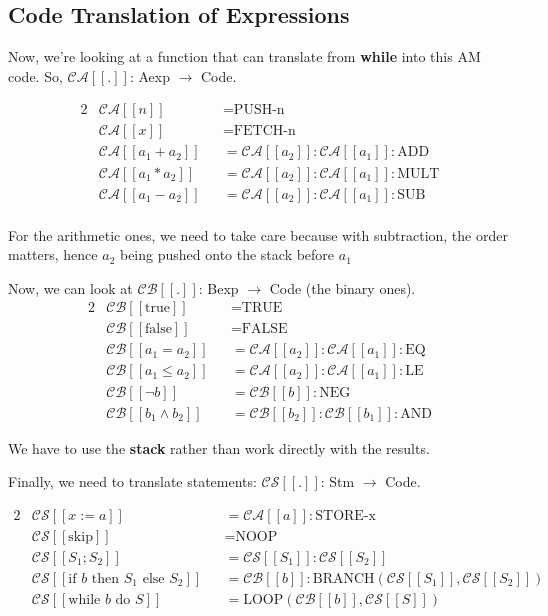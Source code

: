 \documentclass[11pt,a4paper,headsepline,titlepage,dvipsnames,cmyk]{scrartcl}
\begin{document}
\subsection{Code Translation of Expressions}%
\label{sub:code-translation}
Now, we're looking at a function that can translate from \textbf{while}
into this AM code. So, $\mathcal{CA} [\![.]\!]$: Aexp $\rightarrow$ Code.

\begin{alignat*}{2}
   &\mathcal{CA} [\![n]\!] &&= \text{PUSH-n } \\
   &\mathcal{CA} [\![x]\!] &&= \text{FETCH-n } \\
   &\mathcal{CA} [\![a_1 + a_2]\!] &&= \mathcal{CA}[\![a_2]\!] :
   \mathcal{CA}[\![a_1]\!]:\text{ADD} \\
   &\mathcal{CA} [\![a_1 * a_2]\!] &&= \mathcal{CA}[\![a_2]\!] :
   \mathcal{CA}[\![a_1]\!]:\text{MULT} \\
   &\mathcal{CA} [\![a_1 - a_2]\!] &&= \mathcal{CA}[\![a_2]\!] :
   \mathcal{CA}[\![a_1]\!]:\text{SUB} \\
\end{alignat*}

For the arithmetic ones, we need to take care because with subtraction,
the order matters, hence $a_2$ being pushed onto the stack before $a_1$

Now, we can look at $\mathcal{CB} [\![.]\!]$: Bexp $\rightarrow$ Code (the
binary ones).
\begin{alignat*}{2}
   &\mathcal{CB} [\![\text{true}]\!] &&= \text{TRUE} \\
   &\mathcal{CB} [\![\text{false}]\!] &&= \text{FALSE} \\
   &\mathcal{CB} [\![a_1 = a_2]\!] &&=
   \mathcal{CA}[\![a_2]\!]:\mathcal{CA}[\![a_1]\!]:\text{EQ} \\
   &\mathcal{CB} [\![a_1 \le a_2]\!] &&=
   \mathcal{CA}[\![a_2]\!]:\mathcal{CA}[\![a_1]\!]:\text{LE}\\
   &\mathcal{CB}[\![\neg b]\!] &&= \mathcal{CB}[\![b]\!]:\text{NEG} \\
   &\mathcal{CB} [\![b_1 \wedge b_2]\!] &&=
   \mathcal{CB}[\![b_2]\!]:\mathcal{CB}[\![b_1]\!]:\text{AND}
\end{alignat*}

We have to use the \textbf{stack} rather than work directly with the
results.

Finally, we need to translate statements: $\mathcal{CS} [\![.]\!]$: Stm
$\rightarrow$ Code.

\begin{alignat*}{2}
    &\mathcal{CS}[\![x:=a]\!] &&= \mathcal{CA}[\![a]\!]:\text{STORE-x} \\
    &\mathcal{CS}[\![\text{skip}]\!] &&= \text{NOOP} \\
    &\mathcal{CS}[\![S_1;S_2]\!] &&= \mathcal{CS}[\![S_1]]:\mathcal{CS}[\![S_2]] \\
    &\mathcal{CS}[\![\text{if } b \text{ then } S_1 \text{ else } S_2]\!] &&= \mathcal{CB}[\![b]\!]:\text{BRANCH}(\mathcal{CS}[\![S_1]\!],\mathcal{CS}[\![S_2]\!]) \\
    &\mathcal{CS}[\![\text{while } b \text{ do } S]\!] &&= \text{LOOP}(\mathcal{CB}[\![b]\!],\mathcal{CS}[\![S]\!])
\end{alignat*}
\end{document}
